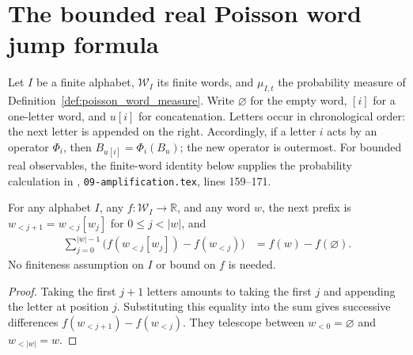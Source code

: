 \section{The bounded real Poisson word jump formula}
\label{sec:poisson_word_jump}

Let $I$ be a finite alphabet, $\mathcal W_I$ its finite words, and
$\mu_{I,t}$ the probability measure of
Definition~\ref{def:poisson_word_measure}.  Write $\varnothing$ for the
empty word, $[i]$ for a one-letter word, and $u[i]$ for concatenation.
Letters occur in chronological order: the next letter is appended on the
right.  Accordingly, if a letter $i$ acts by an operator $\Phi_i$, then
$B_{u[i]}=\Phi_i(B_u)$; the new operator is outermost.
For bounded real observables, the finite-word identity below supplies
the probability calculation in \cite{OpenAI2026AreaLaw},
\texttt{09-amplification.tex}, lines 159--171.

\begin{theorem}
\label{thm:poisson_word_prefix_increment}
\leanok
{}
For any alphabet $I$, any $f:\mathcal W_I\to\mathbb R$, and any word $w$,
the next prefix is $w_{<j+1}=w_{<j}[w_j]$ for $0\leq j<|w|$, and
\begin{align}
 \sum_{j=0}^{|w|-1}
 \bigl(f(w_{<j}[w_j])-f(w_{<j})\bigr)
 &=f(w)-f(\varnothing).
 \label{eq:poisson_jump_telescope}
\end{align}
No finiteness assumption on $I$ or bound on $f$ is needed.
\end{theorem}
\begin{proof}
\leanok
{}
Taking the first $j+1$ letters amounts to taking the first $j$ and
appending the letter at position $j$.  Substituting this equality into
the sum gives successive differences
$f(w_{<j+1})-f(w_{<j})$.  They telescope between
$w_{<0}=\varnothing$ and $w_{<|w|}=w$.
\end{proof}

